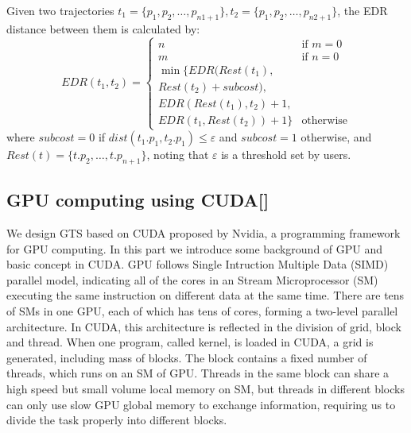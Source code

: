 \documentclass[conference]{IEEEtran}
\begin{document}
	\begin{define}
		Given two trajectories $t_{1}=\{p_{1},p_{2},\ldots,p_{n1+1}\},t_{2}=\{p_{1},p_{2},\ldots,p_{n2+1}\}$, the EDR distance between them is calculated by:
		\begin{equation*}
		EDR(t_{1},t_{2}) = 
		\begin{cases}
		n & \text{if $m=0$} \\
		m & \text{if $n=0$} \\
		\min \{EDR(Rest(t_{1}),\\Rest(t_{2})+subcost),\\EDR(Rest(t_{1}),t_{2})+1,\\EDR(t_{1},Rest(t_{2}))+1\} & \text{otherwise}
		\end{cases}
		\end{equation*}
		where $subcost = 0$ if $dist(t_{1}.p_{1},t_{2}.p_{1})\leqslant \varepsilon$ and $subcost = 1$ otherwise, and $Rest(t)=\{t.p_{2},\ldots ,t.p_{n+1}\}$, noting that $\varepsilon$ is a threshold set by users.
	\end{define}
	

\subsection{GPU computing using CUDA[]}
We design GTS based on CUDA proposed by Nvidia, a programming framework for GPU computing. In this part we introduce some background of GPU and basic concept in CUDA. GPU follows Single Intruction Multiple Data (SIMD) parallel model, indicating all of the cores in an Stream Microprocessor (SM) executing the same instruction on different data at the same time. There are tens of SMs in one GPU, each of which has tens of cores, forming a two-level parallel architecture. In CUDA, this architecture is reflected in the division of grid, block and thread. When one program, called kernel, is loaded in CUDA, a grid is generated, including mass of blocks. The block contains a fixed number of threads, which runs on an SM of GPU. Threads in the same block can share a high speed but small volume local memory on SM, but threads in different blocks can only use slow GPU global memory to exchange information, requiring us to divide the task properly into different blocks. 
\end{document}
